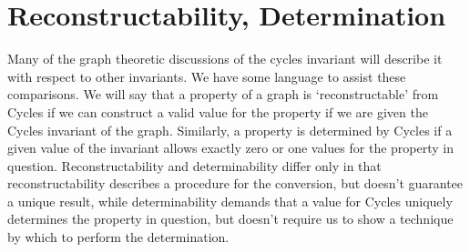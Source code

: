 \section{Reconstructability, Determination}
Many of the graph theoretic discussions of the cycles invariant will describe it with respect to other invariants. We have some language to assist these comparisons.
We will say that a property of a graph is `reconstructable' from Cycles if we can construct a valid value for the property if we are given the Cycles invariant of the graph.
Similarly, a property is determined by Cycles if a given value of the invariant allows exactly zero or one values for the property in question.
Reconstructability and determinability differ only in that reconstructability describes a procedure for the conversion, but doesn't guarantee a unique result, while determinability demands that a value for Cycles uniquely determines the property in question, but doesn't require us to show a technique by which to perform the determination.